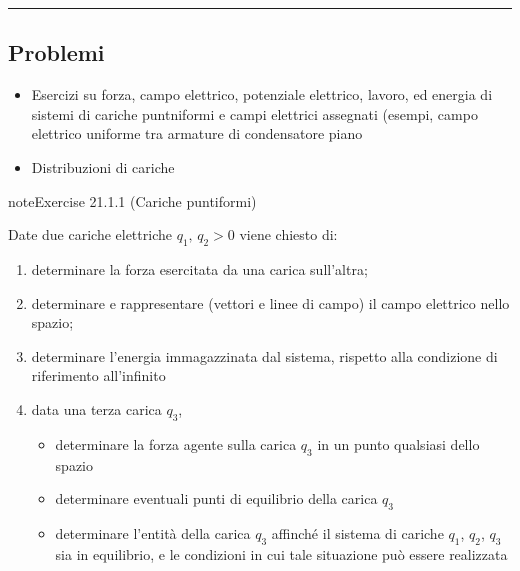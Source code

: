 \documentclass[letterpaper,10pt,italian]{jupyterBook}
\begin{document}
\bigskip\hrule\bigskip


\sphinxstepscope


\subsection{Problemi}
\label{\detokenize{ch/electromagnetism/electrostatics-problems:problemi}}\label{\detokenize{ch/electromagnetism/electrostatics-problems:physics-hs-electromagnetism-electrostatics-problems}}\label{\detokenize{ch/electromagnetism/electrostatics-problems::doc}}\begin{itemize}
\item {} 
\sphinxAtStartPar
Esercizi su forza, campo elettrico, potenziale elettrico, lavoro, ed energia di sistemi di cariche puntniformi e campi elettrici assegnati (esempi, campo elettrico uniforme tra armature di condensatore piano

\item {} 
\sphinxAtStartPar
Distribuzioni di cariche

\end{itemize}
 \label{exercise:ch/electromagnetism/electrostatics-problems-exercise-0}

\begin{sphinxadmonition}{note}{Exercise 21.1.1 (Cariche puntiformi)}



\sphinxAtStartPar
Date due cariche elettriche \(q_1, \, q_2 > 0\) viene chiesto di:
\begin{enumerate}
%
\item {} 
\sphinxAtStartPar
determinare la forza esercitata da una carica sull’altra;

\item {} 
\sphinxAtStartPar
determinare e rappresentare (vettori e linee di campo) il campo elettrico nello spazio;

\item {} 
\sphinxAtStartPar
determinare l’energia immagazzinata dal sistema, rispetto alla condizione di riferimento all’infinito

\item {} 
\sphinxAtStartPar
data una terza carica \(q_3\),
\begin{itemize}
\item {} 
\sphinxAtStartPar
determinare la forza agente sulla carica \(q_3\) in un punto qualsiasi dello spazio

\item {} 
\sphinxAtStartPar
determinare eventuali punti di equilibrio della carica \(q_3\)

\item {} 
\sphinxAtStartPar
determinare l’entità della carica \(q_3\) affinché il sistema di cariche \(q_1\), \(q_2\), \(q_3\) sia in equilibrio, e le condizioni in cui tale situazione può essere realizzata

\end{itemize}

\end{enumerate}
\end{sphinxadmonition}
 \label{exercise:ch/electromagnetism/electrostatics-problems-exercise-1}
\end{document}
